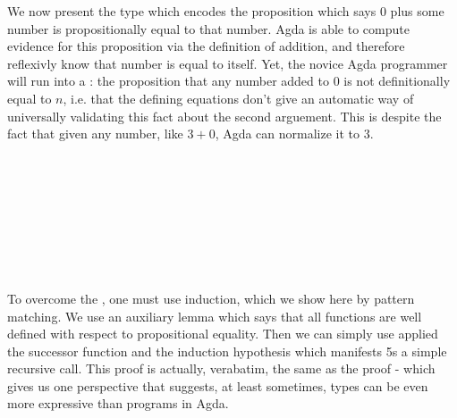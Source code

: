 We now present the type which encodes the proposition which says $0$
plus some number is propositionally equal to that number. Agda is able to
compute evidence for this proposition via the definition of addition, and
therefore reflexivly know that number is equal to itself. Yet, the novice
Agda programmer will run into a : the proposition that any number
added to $0$ is not definitionally equal to $n$, i.e. that the defining
equations don't give an automatic way of universally validating this fact about
the second arguement. This is despite the fact that given any number, like $3+0$,
Agda can normalize it to $3$.

\begin{code}%
\>[0]\AgdaSpace{}%
\AgdaSymbol{:}\AgdaSpace{}%
\AgdaSpace{}%
\AgdaSymbol{(}\AgdaSpace{}%
\AgdaSymbol{:}\AgdaSpace{}%
\AgdaSymbol{)}\AgdaSpace{}%
\AgdaSpace{}%
\AgdaSpace{}%
\AgdaOperator{\AgdaFunction{+}}\AgdaSpace{}%
\AgdaSpace{}%
\AgdaSpace{}%
\<%
\\
\>[0]\AgdaSpace{}%
\AgdaSpace{}%
\AgdaSymbol{=}\AgdaSpace{}%
\<%
\\
%
\\[\AgdaEmptyExtraSkip]%
\>[0]\AgdaSpace{}%
\AgdaSymbol{:}\AgdaSpace{}%
\AgdaSpace{}%
\AgdaOperator{\AgdaFunction{+}}\AgdaSpace{}%
\AgdaSpace{}%
\AgdaSpace{}%
\<%
\\
\>[0]\AgdaSpace{}%
\AgdaSymbol{=}\AgdaSpace{}%
\<%
\\
%
\\[\AgdaEmptyExtraSkip]%
\>[0]\AgdaSpace{}%
\AgdaSymbol{:}\AgdaSpace{}%
\AgdaSpace{}%
\AgdaSymbol{(}\AgdaSpace{}%
\AgdaSymbol{:}\AgdaSpace{}%
\AgdaSymbol{)}\AgdaSpace{}%
\AgdaSpace{}%
\AgdaSpace{}%
\AgdaOperator{\AgdaFunction{+}}\AgdaSpace{}%
\AgdaSpace{}%
\AgdaSpace{}%
\<%
\\
\>[0]\AgdaSpace{}%
\AgdaSymbol{=}\AgdaSpace{}%
\<%
\end{code}

To overcome the , one must use induction, which we show here by
pattern matching. We use an auxiliary lemma  which says that all
functions are well defined with respect to propositional equality. Then we can
simply use  applied the successor function and the induction hypothesis
which manifests 5s a simple recursive call. This proof is actually, verabatim,
the same as the  proof - which gives us one perspective that
suggests, at least sometimes, types can be even more expressive than programs in
Agda.

